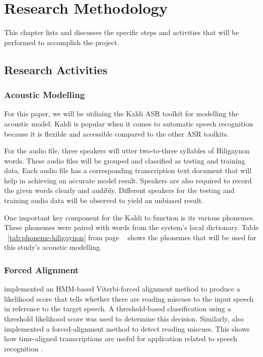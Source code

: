 \chapter{Research Methodology}
This chapter lists and discusses the specific steps and activities that will be performed to accomplish the project.

\section{Research Activities}
\subsection{Acoustic Modelling}
For this paper, we will be utilizing the Kaldi ASR toolkit for modelling the acoustic model. Kaldi is popular when it comes to automatic speech recognition because it is flexible and accessible compared to the other ASR toolkits. 

For the audio file, three speakers will utter two-to-three syllables of Hiligaynon words. These audio files will be grouped and classified as testing and training data. Each audio file has a corresponding transcription text document that will help in achieving an accurate model result. Speakers are also required to record the given words clearly and audibly. Different speakers for the testing and training audio data will be observed to yield an unbiased result.

One important key component for the Kaldi to function is its various phonemes. These phonemes were paired with words from the system’s local dictionary. Table ~\ref{tab:phoneme-hiligaynon} from page ~\pageref{tab:phoneme-hiligaynon} shows the phonemes that will be used for this study's acoustic modelling.

\subsection{Forced Alignment}
\citeauthor{pascual-2017} \citeyear{pascual-2017} implemented an HMM-based Viterbi-forced alignment method to produce a likelihood score that tells whether there are reading miscues to the input speech in reference to the target speech. A threshold-based classification using a threshold likelihood score was used to determine this decision. Similarly, \citeauthor{rasmussen-2009} \citeyear{rasmussen-2009} also implemented a forced-alignment method to detect reading miscues. This shows how time-aligned transcriptions are useful for application related to speech recognition \cite{dimzon-2020}.

